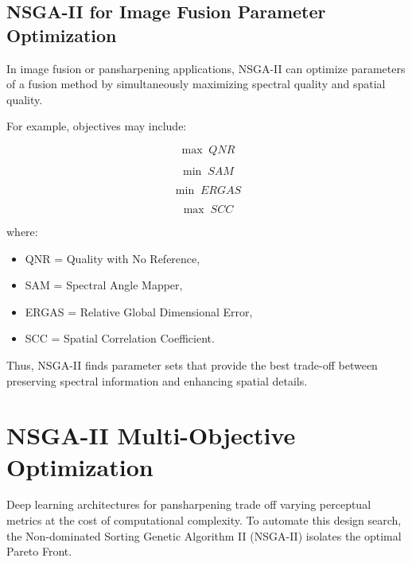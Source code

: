 \documentclass[11pt]{article}
\begin{document}
\subsection{NSGA-II for Image Fusion Parameter Optimization}

In image fusion or pansharpening applications, NSGA-II can optimize parameters of a fusion method by simultaneously maximizing spectral quality and spatial quality.

For example, objectives may include:

\begin{equation}
\max \; QNR
\end{equation}

\begin{equation}
\min \; SAM
\end{equation}

\begin{equation}
\min \; ERGAS
\end{equation}

\begin{equation}
\max \; SCC
\end{equation}

where:
\begin{itemize}
    \item QNR = Quality with No Reference,
    \item SAM = Spectral Angle Mapper,
    \item ERGAS = Relative Global Dimensional Error,
    \item SCC = Spatial Correlation Coefficient.
\end{itemize}

Thus, NSGA-II finds parameter sets that provide the best trade-off between preserving spectral information and enhancing spatial details.

\section{NSGA-II Multi-Objective Optimization}
Deep learning architectures for pansharpening trade off varying perceptual metrics at the cost of computational complexity. To automate this design search, the Non-dominated Sorting Genetic Algorithm II (NSGA-II) isolates the optimal Pareto Front.
\end{document}
